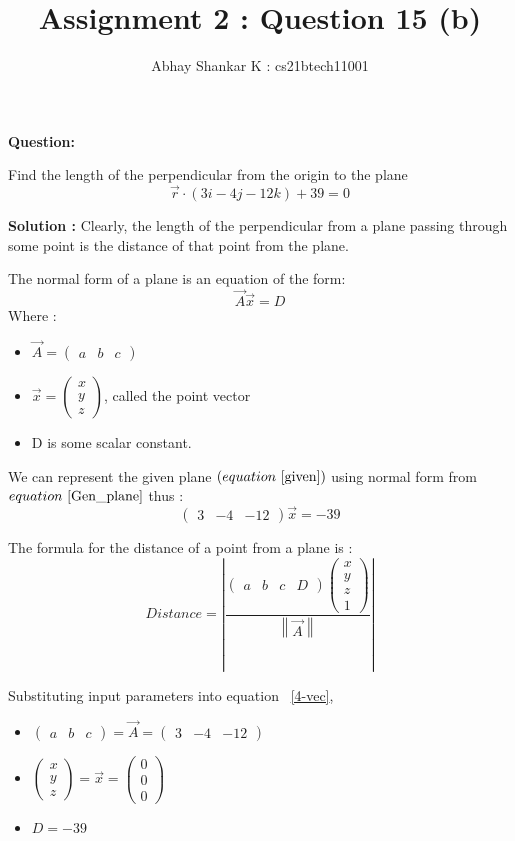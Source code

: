 \documentclass[11pt, oneside, twocolumn, reqno]{article}   	%
\title{Assignment 2 : Question 15 (b)}
\author{Abhay Shankar K : cs21btech11001}
\newcommand{\myvec}[1]{\ensuremath{\begin{pmatrix}#1\end{pmatrix}}}
\providecommand{\norm}[1]{\left\lVert#1\right\rVert}
\providecommand{\abs}[1]{\left\vert#1\right\vert}
\providecommand{\brak}[1]{\ensuremath{\left(#1\right)}}
\begin{document}
\maketitle

\textbf{Question:}

Find the length of the perpendicular from the origin to the plane 
\begin{equation} \label{given}
\vec{r} \cdot \brak{3i - 4j - 12k} + 39 = 0
\end{equation}

\textbf{Solution :}
Clearly, the length of the perpendicular from a plane passing through some point is the distance of that point from the plane.

The normal form of a plane is an equation of the form:
\begin{equation}\label{Gen_plane}
\vec{A}\vec{x} = D
\end{equation}
Where :
\begin{itemize}
\item $\vec{A} = \myvec{a & b & c}$
\item $\vec{x} = \myvec{x \\ y \\ z}$, called the point vector
\item D is some scalar constant.
\end{itemize}

We can represent the given plane \brak{equation ~\eqref{given}} using normal form from $equation ~\eqref{Gen_plane}$ thus :
\begin{equation} \label{normal_form}
\myvec{3 & -4 & -12} \vec{x} = -39
\end{equation}

The formula for the distance of a point from a plane is :
\begin{equation} \label{4-vec}
Distance = \abs{\frac{\myvec{a & b & c & D} \myvec{x \\ y \\ z \\ 1}}{\norm{\vec{A}}}}
\end{equation}

Substituting input parameters into equation ~\eqref{4-vec},
\begin{itemize}
\item $\myvec{a & b & c} = \vec{A} = \myvec{3 & -4 & -12}$
\item $\myvec{x \\ y \\ z} = \vec{x} = \myvec{0 \\ 0 \\ 0}$
\item $D = -39$
\end{itemize}
\end{document}
